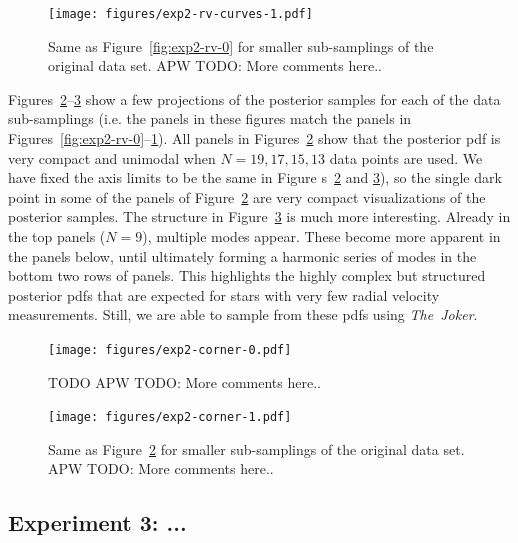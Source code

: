 \documentclass[manuscript, letterpaper]{aastex6}
\newcommand{\project}[1]{\textsl{#1}}
\newcommand{\samplername}{\project{The~Joker}}
\newcommand{\figname}{Figure}
\newcommand{\todoapw}[1]{{\color{red}APW TODO: #1}}
\begin{document}
\begin{figure}[p]
\begin{center}
\texttt{[image: figures/exp2-rv-curves-1.pdf]}
\end{center}
\caption{%
Same as \figname~\ref{fig:exp2-rv-0} for smaller sub-samplings of the
original data set.
\todoapw{More comments here..}
\label{fig:exp2-rv-1}}
\end{figure}

\figname s~\ref{fig:exp2-corner-0}--\ref{fig:exp2-corner-1} show a few
projections of the posterior samples for each of the data sub-samplings (i.e.
the panels in these figures match the panels in
\figname s~\ref{fig:exp2-rv-0}--\ref{fig:exp2-rv-1}).
All panels in \figname s~\ref{fig:exp2-corner-0} show that the posterior pdf is
very compact and unimodal when $N=19,17,15,13$ data points are used.
We have fixed the axis limits to be the same in \figname
s~\ref{fig:exp2-corner-0} and \ref{fig:exp2-corner-1}), so the single dark point
in some of the panels of \figname~\ref{fig:exp2-corner-0} are very compact
visualizations of the posterior samples.
The structure in \figname~\ref{fig:exp2-corner-1} is much more interesting.
Already in the top panels ($N=9$), multiple modes appear.
These become more apparent in the panels below, until ultimately forming a
harmonic series of modes in the bottom two rows of panels.
This highlights the highly complex but structured posterior pdfs that are
expected for stars with very few radial velocity measurements.
Still, we are able to sample from these pdfs using \samplername.

\begin{figure}[p]
\begin{center}
\texttt{[image: figures/exp2-corner-0.pdf]}
\end{center}
\caption{%
TODO
\todoapw{More comments here..}
\label{fig:exp2-corner-0}}
\end{figure}

\begin{figure}[p]
\begin{center}
\texttt{[image: figures/exp2-corner-1.pdf]}
\end{center}
\caption{%
Same as \figname~\ref{fig:exp2-corner-0} for smaller sub-samplings of the
original data set.
\todoapw{More comments here..}
\label{fig:exp2-corner-1}}
\end{figure}

\subsection{Experiment 3: ...}
\end{document}
